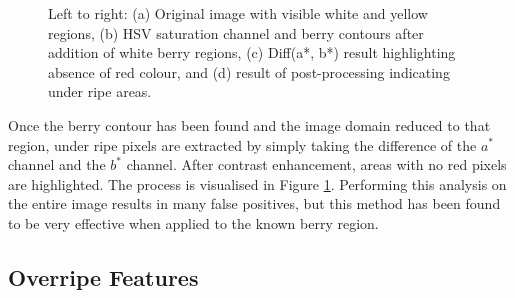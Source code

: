 \documentclass[fleqn,twoside,12pt]{report}
\begin{document}
\begin{figure}[ht]
	\caption{Left to right: (a) Original image with visible white and yellow regions, (b) HSV saturation channel and berry contours after addition of white berry regions, (c) Diff(a*, b*) result highlighting absence of red colour, and (d) result of post-processing indicating under ripe areas.}
	\label{fig:under ripe_process}
\end{figure}

Once the berry contour has been found and the image domain reduced to that region, under ripe pixels are extracted by simply taking the difference of the $a^*$ channel and the $b^*$ channel. After contrast enhancement, areas with no red pixels are highlighted. The process is visualised in Figure \ref{fig:under ripe_process}. Performing this analysis on the entire image results in many false positives, but this method has been found to be very effective when applied to the known berry region.   


\subsection{Overripe Features}
\end{document}

